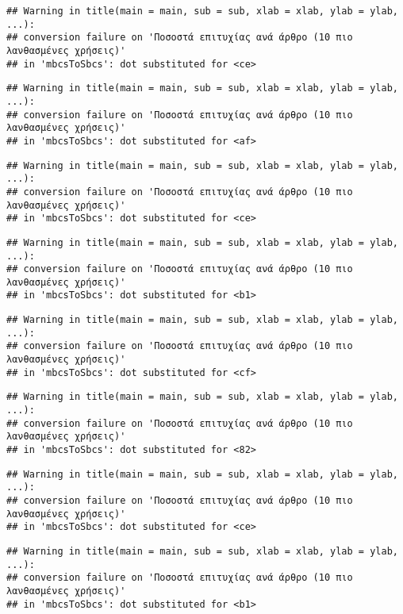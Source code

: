 \documentclass[
]{article}
\begin{document}
\begin{verbatim}
## Warning in title(main = main, sub = sub, xlab = xlab, ylab = ylab, ...):
## conversion failure on 'Ποσοστά επιτυχίας ανά άρθρο (10 πιο λανθασμένες χρήσεις)'
## in 'mbcsToSbcs': dot substituted for <ce>
\end{verbatim}

\begin{verbatim}
## Warning in title(main = main, sub = sub, xlab = xlab, ylab = ylab, ...):
## conversion failure on 'Ποσοστά επιτυχίας ανά άρθρο (10 πιο λανθασμένες χρήσεις)'
## in 'mbcsToSbcs': dot substituted for <af>
\end{verbatim}

\begin{verbatim}
## Warning in title(main = main, sub = sub, xlab = xlab, ylab = ylab, ...):
## conversion failure on 'Ποσοστά επιτυχίας ανά άρθρο (10 πιο λανθασμένες χρήσεις)'
## in 'mbcsToSbcs': dot substituted for <ce>
\end{verbatim}

\begin{verbatim}
## Warning in title(main = main, sub = sub, xlab = xlab, ylab = ylab, ...):
## conversion failure on 'Ποσοστά επιτυχίας ανά άρθρο (10 πιο λανθασμένες χρήσεις)'
## in 'mbcsToSbcs': dot substituted for <b1>
\end{verbatim}

\begin{verbatim}
## Warning in title(main = main, sub = sub, xlab = xlab, ylab = ylab, ...):
## conversion failure on 'Ποσοστά επιτυχίας ανά άρθρο (10 πιο λανθασμένες χρήσεις)'
## in 'mbcsToSbcs': dot substituted for <cf>
\end{verbatim}

\begin{verbatim}
## Warning in title(main = main, sub = sub, xlab = xlab, ylab = ylab, ...):
## conversion failure on 'Ποσοστά επιτυχίας ανά άρθρο (10 πιο λανθασμένες χρήσεις)'
## in 'mbcsToSbcs': dot substituted for <82>
\end{verbatim}

\begin{verbatim}
## Warning in title(main = main, sub = sub, xlab = xlab, ylab = ylab, ...):
## conversion failure on 'Ποσοστά επιτυχίας ανά άρθρο (10 πιο λανθασμένες χρήσεις)'
## in 'mbcsToSbcs': dot substituted for <ce>
\end{verbatim}

\begin{verbatim}
## Warning in title(main = main, sub = sub, xlab = xlab, ylab = ylab, ...):
## conversion failure on 'Ποσοστά επιτυχίας ανά άρθρο (10 πιο λανθασμένες χρήσεις)'
## in 'mbcsToSbcs': dot substituted for <b1>
\end{verbatim}
\end{document}
